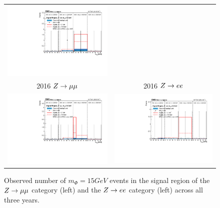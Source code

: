 \begin{figure}[htb!]
\begin{tabular}{c c}
		\includegraphics[width=0.45\linewidth]{figs/05_analysis/closure_ZH_ELE_m15_data_2017.pdf} \\
		2016 $\VZ\to\mu\mu$ & 2016 $\VZ\to ee$\\
		\includegraphics[width=0.45\linewidth]{figs/05_analysis/closure_ZH_MU_m15_data_2016.pdf} &
		\includegraphics[width=0.45\linewidth]{figs/05_analysis/closure_ZH_ELE_m15_data_2016.pdf} \\
	\end{tabular}
	\caption[Observed number of $m_\Phi=15\unit{GeV}$ events in the signal region of the $\VZ\to\mu\mu$ category (left) and the $\VZ\to ee$ category (left) across all three years.]{Observed number of $m_\Phi=15\unit{GeV}$ events in the signal region of the $\VZ\to\mu\mu$ category (left) and the $\VZ\to ee$ category (left) across all three years.}
	\label{fig:results_m15}
\end{figure}

